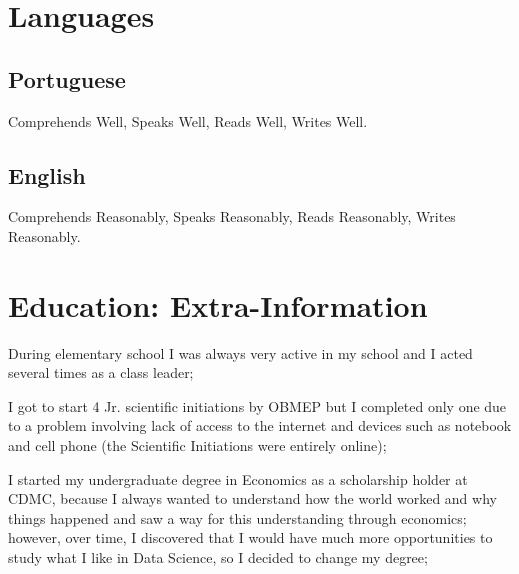 \documentclass[letterpaper]{twentysecondcv} %
\begin{document}
\begin{twenty} %

\end{twenty}


\section{Languages}

\subsection{Portuguese}{Comprehends Well, Speaks Well, Reads Well, Writes Well.}
\subsection{English}{Comprehends Reasonably, Speaks Reasonably, Reads Reasonably, Writes Reasonably.}



\newpage %

\makeprofile %

\section{Education: Extra-Information}

During elementary school I was always very active in my school and I acted several times as a class leader;

I got to start 4 Jr. scientific initiations by OBMEP but I completed only one due to a problem involving lack of access to the internet and devices such as notebook and cell phone (the Scientific Initiations were entirely online);

I started my undergraduate degree in Economics as a scholarship holder at CDMC, because I always wanted to understand how the world worked and why things happened and saw a way for this understanding through economics; however, over time, I discovered that I would have much more opportunities to study what I like in Data Science, so I decided to change my degree;
\end{document}
